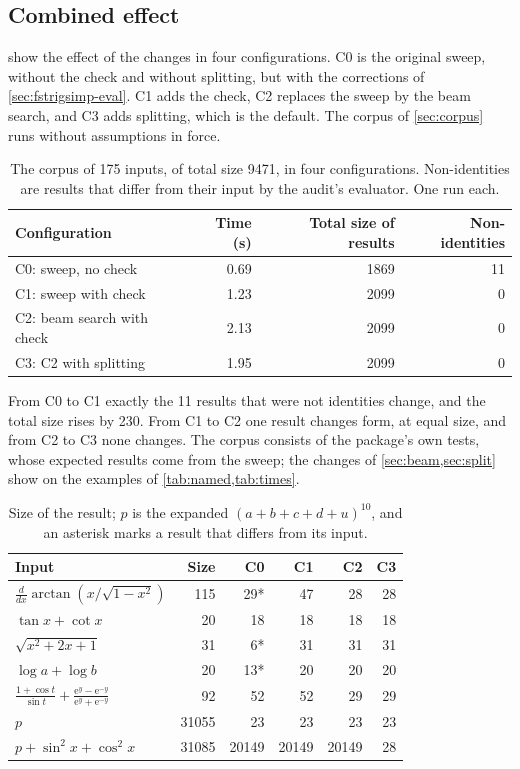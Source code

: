 \documentclass[11pt]{amsart}
\theoremstyle{definition}
\theoremstyle{remark}
\begin{document}
\subsection{Combined effect}

 show the effect of the changes in four
configurations. C0 is the original sweep, without the check and without
splitting, but with the corrections of \cref{sec:fstrigsimp-eval}. C1 adds
the check, C2 replaces the sweep by the beam search, and C3 adds splitting,
which is the default. The corpus of \cref{sec:corpus} runs without
assumptions in force.

\begin{table}[ht]
\caption{The corpus of 175 inputs, of total size 9471, in four
configurations. Non-identities are results that differ from their input by
the audit's evaluator. One run each.}
\label{tab:corpus}
\small
\begin{tabular}{@{}lrrr@{}}
\toprule
Configuration & Time (s) & Total size of results & Non-identities \\
\midrule
C0: sweep, no check & 0.69 & 1869 & 11 \\
C1: sweep with check & 1.23 & 2099 & 0 \\
C2: beam search with check & 2.13 & 2099 & 0 \\
C3: C2 with splitting & 1.95 & 2099 & 0 \\
\bottomrule
\end{tabular}
\end{table}

From C0 to C1 exactly the 11 results that were not identities change, and
the total size rises by 230. From C1 to C2 one result changes form, at
equal size, and from C2 to C3 none changes. The corpus consists of the
package's own tests, whose expected results come from the sweep;
the changes of \cref{sec:beam,sec:split} show on the examples of
\cref{tab:named,tab:times}.

\begin{table}[ht]
\caption{Size of the result; $p$ is the expanded $(a+b+c+d+u)^{10}$, and an
asterisk marks a result that differs from its input.}
\label{tab:named}
\small
\begin{tabular}{@{}lrrrrr@{}}
\toprule
Input & Size & C0 & C1 & C2 & C3 \\
\midrule
$\frac{d}{dx}\arctan(x/\sqrt{1-x^2})$ & 115 & 29* & 47 & 28 & 28 \\
$\tan x + \cot x$ & 20 & 18 & 18 & 18 & 18 \\
$\sqrt{x^2+2x+1}$ & 31 & 6* & 31 & 31 & 31 \\
$\log a + \log b$ & 20 & 13* & 20 & 20 & 20 \\
$\frac{1+\cos t}{\sin t} + \frac{\mathrm{e}^y-\mathrm{e}^{-y}}{\mathrm{e}^y+\mathrm{e}^{-y}}$
  & 92 & 52 & 52 & 29 & 29 \\
$p$ & 31055 & 23 & 23 & 23 & 23 \\
$p + \sin^2 x + \cos^2 x$ & 31085 & 20149 & 20149 & 20149 & 28 \\
\bottomrule
\end{tabular}
\end{table}
\end{document}
